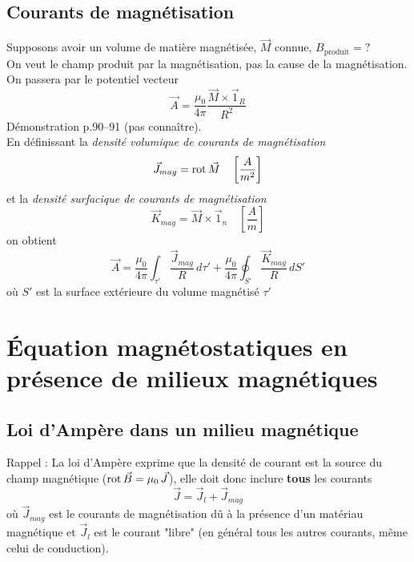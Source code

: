 \documentclass[11pt, a4paper, openany]{book}
\begin{document}
		\subsection{Courants de magnétisation}
		Supposons avoir un volume de matière magnétisée, $\vec M$ connue, $B_{\text{produit}}=?$\\
		On veut le champ produit par la magnétisation, pas la cause de la magnétisation. On passera par le potentiel vecteur \begin{equation}
		\vec A=\frac{\mu_0}{4\pi}\frac{\vec M\times \vec 1_R}{R^2}
		\end{equation}
		Démonstration p.90--91 (pas connaître).\\
		En définissant la \textit{densité volumique de courants de magnétisation} \begin{equation}
		\vec J_{mag}=\rot\vec M\quad\left[\frac{A}{m^2}\right]
		\end{equation}
		et la \textit{densité surfacique de courants de magnétisation}
		\begin{equation}
		\vec K_{mag}=\vec M\times\vec 1_n\quad\left[\frac{A}{m}\right]
		\end{equation}
		on obtient
		\begin{equation}
		\vec A=\frac{\mu_0}{4\pi}\int_{\tau'}\frac{\vec J_{mag}}{R}\,d\tau'+\frac{\mu_0}{4\pi}\oint_{S'}\frac{\vec K_{mag}}{R}\,dS'
		\end{equation}
		où $S'$ est la surface extérieure du volume magnétisé $\tau'$
		\section{Équation magnétostatiques en présence de milieux magnétiques}
		\subsection{Loi d'Ampère dans un milieu magnétique}
		Rappel : La loi d'Ampère exprime que la densité de courant est la source du champ magnétique ($\rot\vec B=\mu_0\,\vec J$), elle doit donc inclure \textbf{tous} les courants
		\begin{equation}
		\vec J=\vec J_{l}+\vec J_{mag}
		\end{equation}
		où $\vec J_{mag}$ est le courants de magnétisation dû à la présence d'un matériau magnétique et $\vec J_{l}$ est le courant "libre" (en général tous les autres courants, même celui de conduction).\\
		
\end{document}
